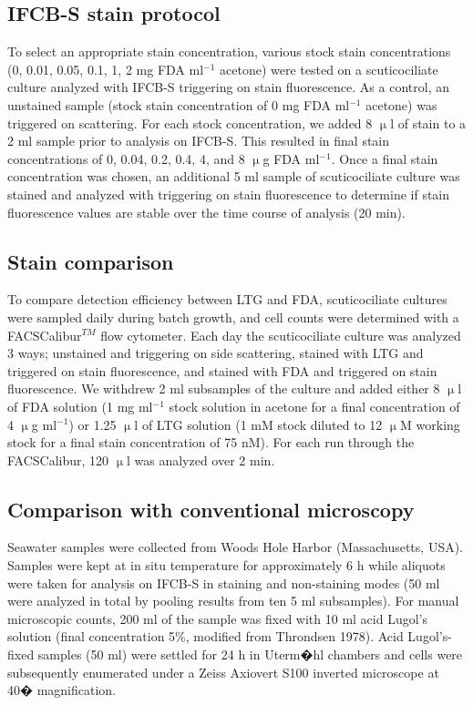\subsection{IFCB-S stain protocol}

To select an appropriate stain concentration, various stock stain concentrations (0, 0.01, 0.05, 0.1, 1, 2 mg FDA ml$^{-1}$ acetone) were tested on a scuticociliate culture analyzed with IFCB-S triggering on stain fluorescence. As a control, an unstained sample (stock stain concentration of 0 mg FDA ml$^{-1}$ acetone) was triggered on scattering. For each stock concentration, we added 8 $\upmu$l of stain to a 2 ml sample prior to analysis on IFCB-S. This resulted in final stain concentrations of 0, 0.04, 0.2, 0.4, 4, and 8 $\upmu$g FDA ml$^{-1}$. Once a final stain concentration was chosen, an additional 5 ml sample of scuticociliate culture was stained and analyzed with triggering on stain fluorescence to determine if stain fluorescence values are stable over the time course of analysis (20 min).

\subsection{Stain comparison}

To compare detection efficiency between LTG and FDA, scuticociliate cultures were sampled daily during batch growth, and cell counts were determined with a FACSCalibur$^{TM}$ flow cytometer. Each day the scuticociliate culture was analyzed 3 ways; unstained and triggering on side scattering, stained with LTG and triggered on stain fluorescence, and stained with FDA and triggered on stain fluorescence. We withdrew 2 ml subsamples of the culture and added either 8 $\upmu$l of FDA solution (1 mg ml$^{-1}$ stock solution in acetone for a final concentration of 4 $\upmu$g ml$^{-1}$) or 1.25 $\upmu$l of LTG solution (1 mM stock diluted to 12 $\upmu$M working stock for a final stain concentration of 75 nM). For each run through the FACSCalibur, 120 $\upmu$l was analyzed over 2 min.

\subsection{Comparison with conventional microscopy }

Seawater samples were collected from Woods Hole Harbor (Massachusetts, USA). Samples were kept at in situ temperature for approximately 6 h while aliquots were taken for analysis on IFCB-S in staining and non-staining modes (50 ml were analyzed in total by pooling results from ten 5 ml subsamples). For manual microscopic counts, 200 ml of the sample was fixed with 10 ml acid Lugol's solution (final concentration 5\%, modified from Throndsen 1978). Acid Lugol's-fixed samples (50 ml) were settled for 24 h in Uterm�hl chambers and cells were subsequently enumerated under a Zeiss Axiovert S100 inverted microscope at 40� magnification.

